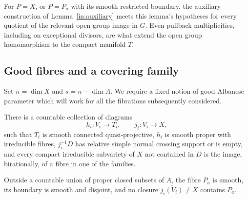 For $P=X$, or $P=P_a$ with its smooth restricted boundary, the
auxiliary construction of Lemma~\ref{in:auxiliary} meets this lemma's
hypotheses for every quotient of the relevant open group image in
$G$.  Even pullback multiplicities, including on exceptional divisors,
are what extend the open group homomorphism to the compact manifold
$T$.

\subsection{Good fibres and a covering family}

Set $n=\dim X$ and $s=n-\dim A$.  We require a fixed notion of good
Albanese parameter which will work for all the fibrations subsequently
considered.

\begin{lemma}\label{in:cycle-families}
There is a countable collection of diagrams
\[
 h_i:V_i\longrightarrow T_i,
 \qquad j_i:V_i\longrightarrow X,
\]
such that $T_i$ is smooth connected quasi-projective, $h_i$ is smooth
proper with irreducible fibres, $j_i^{-1}D$ has relative simple normal
crossing support or is empty, and every compact irreducible subvariety
of $X$ not contained in $D$ is the image, birationally, of a fibre in
one of the families.

Outside a countable union of proper closed subsets of $A$, the fibre
$P_a$ is smooth, its boundary is smooth and disjoint, and no closure
$\overline{j_i(V_i)}\ne X$ contains $P_a$.
\end{lemma}

